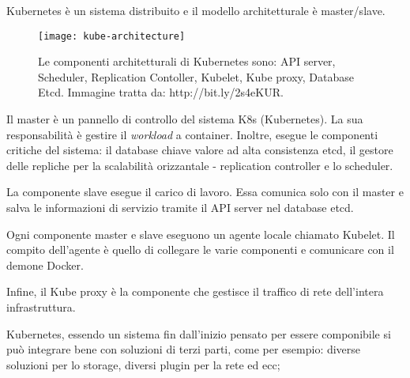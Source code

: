 \begin{itemize}
	Kubernetes è un sistema distribuito e il modello architetturale è master/slave.
	
	\begin{figure}[htbp]
		\begin{center}
			\texttt{[image: kube-architecture]}
			\caption{Le componenti architetturali di Kubernetes sono: API server, Scheduler, Replication Contoller, Kubelet, Kube proxy, Database Etcd. Immagine tratta da: http://bit.ly/2s4eKUR.}
		\end{center}
	\end{figure}
	
	Il master è un pannello di controllo del sistema K8s (Kubernetes). La sua responsabilità è gestire il \textit{workload} a container. Inoltre, esegue le componenti critiche del sistema: il database chiave valore ad alta consistenza etcd, il gestore delle repliche per la scalabilità orizzantale - replication controller e lo scheduler.  
	
	La componente slave esegue il carico di lavoro. Essa comunica solo con il master e salva le informazioni di servizio tramite il API server nel database etcd. 
	
	Ogni componente master e slave eseguono un agente locale chiamato Kubelet. Il compito dell'agente è quello di collegare le varie componenti e comunicare con il demone Docker. 
	
	Infine, il Kube proxy è la componente che gestisce il traffico di rete dell'intera infrastruttura. 
	
    Kubernetes, essendo un sistema fin dall'inizio pensato per essere componibile 
    si può integrare bene con soluzioni di terzi parti, come per esempio: diverse soluzioni per lo storage, diversi plugin per la rete ed ecc;
	

\end{itemize}
